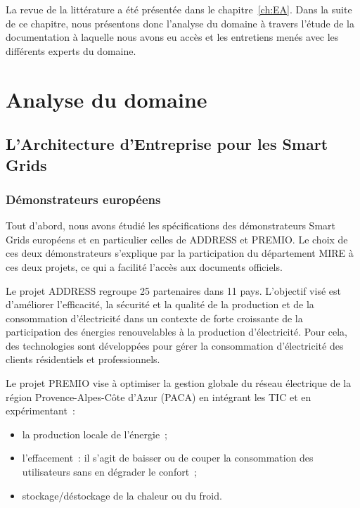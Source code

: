 La revue de la littérature a été présentée dans le chapitre~\ref{ch:EA}.
Dans la suite de ce chapitre, nous présentons donc l'analyse du domaine à travers l'étude
de la documentation à laquelle nous avons eu accès et les entretiens menés avec les différents
experts du domaine.


\section{Analyse du domaine}
\label{sec:analyse_domaine}


    \subsection{L'Architecture d'Entreprise pour les Smart Grids}

        \subsubsection{Démonstrateurs européens}
        \label{sec:DemonstrateursSG}

Tout d'abord, nous avons étudié les spécifications des démonstrateurs Smart Grids
européens et en particulier celles de ADDRESS et PREMIO. Le choix de ces deux
démonstrateurs s'explique par la participation du département MIRE à ces deux
projets, ce qui a facilité l'accès aux documents officiels.



Le projet ADDRESS regroupe 25 partenaires dans 11 pays. L'objectif visé est
d'améliorer l'efficacité, la sécurité et la qualité de la production et de la consommation
d'électricité dans un contexte de forte croissante de la participation des
énergies renouvelables à la production d'électricité. Pour cela, des
technologies sont développées pour gérer la consommation d'électricité des
clients résidentiels et professionnels.

Le projet PREMIO vise à optimiser la gestion globale du réseau électrique de la
région Provence-Alpes-Côte d'Azur (PACA) en intégrant les TIC et en
expérimentant~:
\begin{itemize}
	\item la production locale de l'énergie~;
	\item l'effacement~: il s'agit de baisser ou de couper la consommation des utilisateurs
    sans en dégrader le confort~;
	\item stockage/déstockage de la chaleur ou du froid.
\end{itemize}

